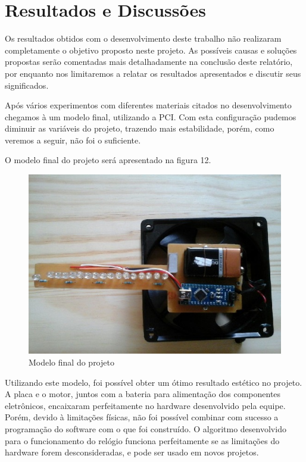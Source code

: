 \chapter{Resultados e Discussões}
\label{chap:resul}

Os resultados obtidos com o desenvolvimento deste trabalho não realizaram completamente o objetivo proposto neste projeto. As possíveis causas e soluções propostas serão comentadas mais detalhadamente na conclusão deste relatório, por enquanto nos limitaremos a relatar os resultados apresentados e discutir seus significados.

Após vários experimentos com diferentes materiais citados no desenvolvimento chegamos à um modelo final, utilizando a PCI. Com esta configuração pudemos diminuir as variáveis do projeto, trazendo mais estabilidade, porém, como veremos a seguir, não foi o suficiente.

O modelo final do projeto será apresentado na figura 12.

\begin{figure}[!h]
	\centering
	\includegraphics{./modelo_final.jpg}
	\caption[Modelo final do projeto]{Modelo final do projeto}
	\label{fig:modelo_final}
\end{figure}

Utilizando este modelo, foi possível obter um ótimo resultado estético no projeto. A placa e o motor, juntos com a bateria para alimentação dos componentes eletrônicos, encaixaram perfeitamente no hardware desenvolvido pela equipe. Porém, devido à limitações físicas, não foi possível combinar com sucesso a programação do software com o que foi construído. O algoritmo desenvolvido para o funcionamento do relógio funciona perfeitamente se as limitações do hardware forem desconsideradas, e pode ser usado em novos projetos.

